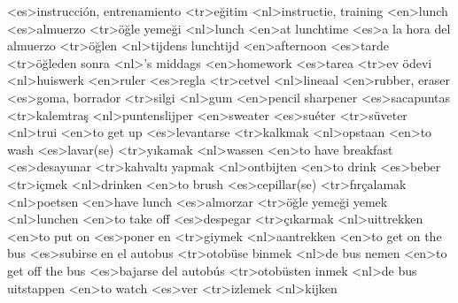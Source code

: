 <es>instrucción, entrenamiento
<tr>eğitim
<nl>instructie, training 
<en>lunch
<es>almuerzo
<tr>öğle yemeği
<nl>lunch 
<en>at lunchtime
<es>a la hora del almuerzo
<tr>öğlen
<nl>tijdens lunchtijd
<en>afternoon
<es>tarde
<tr>öğleden sonra
<nl>'s middags
<en>homework
<es>tarea
<tr>ev ödevi
<nl>huiswerk
<en>ruler
<es>regla
<tr>cetvel
<nl>lineaal
<en>rubber, eraser
<es>goma, borrador
<tr>silgi
<nl>gum
<en>pencil sharpener
<es>sacapuntas
<tr>kalemtraş
<nl>puntenslijper
<en>sweater
<es>suéter
<tr>süveter
<nl>trui
<en>to get up
<es>levantarse
<tr>kalkmak
<nl>opstaan
<en>to wash
<es>lavar(se)
<tr>yıkamak
<nl>wassen
<en>to have breakfast
<es>desayunar
<tr>kahvaltı yapmak
<nl>ontbijten
<en>to drink
<es>beber
<tr>içmek
<nl>drinken
<en>to brush
<es>cepillar(se)
<tr>fırçalamak
<nl>poetsen
<en>have lunch
<es>almorzar
<tr>öğle yemeği yemek
<nl>lunchen
<en>to take off
<es>despegar
<tr>çıkarmak
<nl>uittrekken
<en>to put on
<es>poner en
<tr>giymek
<nl>aantrekken
<en>to get on the bus
<es>subirse en el autobus
<tr>otobüse binmek
<nl>de bus nemen
<en>to get off the bus
<es>bajarse del autobús
<tr>otobüsten inmek
<nl>de bus uitstappen
<en>to watch
<es>ver
<tr>izlemek
<nl>kijken
